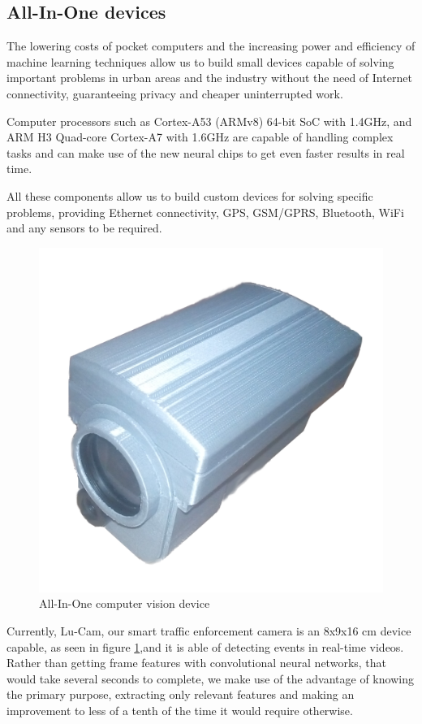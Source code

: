 \documentclass[fleqn,12pt]{SelfArx} %
\begin{document}
\subsection{All-In-One devices}

The lowering costs of pocket computers and the
increasing power and efficiency of machine learning techniques allow us to build small devices capable of solving important problems in urban areas and the industry without the need of Internet connectivity, guaranteeing privacy and cheaper uninterrupted work.

Computer processors such as Cortex-A53 (ARMv8) 64-bit SoC with 1.4GHz, and ARM H3 Quad-core Cortex-A7 with 1.6GHz are capable of handling complex tasks and can make use of the new neural chips to get even faster  results in real time.

All these components allow us to build custom devices for solving specific problems, providing Ethernet connectivity, GPS, GSM/GPRS, Bluetooth, WiFi and any sensors to be required.

\begin{figure}[t]\centering
	\includegraphics[width=0.8\linewidth]{images/lucam_005}
	\caption{All-In-One computer vision device}
	\label{fig:device}
\end{figure}

Currently, Lu-Cam, our smart traffic enforcement camera is an 8x9x16 cm device capable, as seen in figure \ref{fig:device},and it is able of detecting events in real-time videos. Rather than getting frame features with convolutional neural networks, that would take several seconds to complete, we make use of the advantage of knowing the primary purpose, extracting only relevant features and making an improvement to less of a tenth of the time it would require otherwise.
\end{document}
